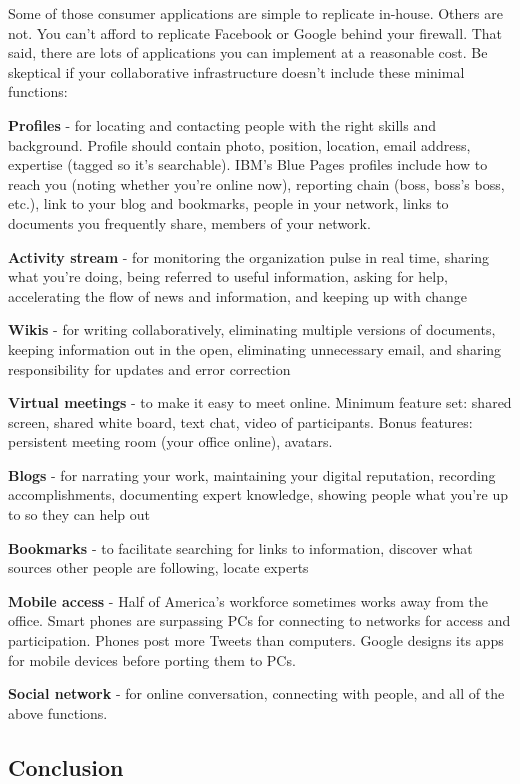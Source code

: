 Some of those consumer applications are simple to replicate in-house.
Others are not. You can't afford to replicate Facebook or Google behind
your firewall. That said, there are lots of applications you can
implement at a reasonable cost. Be skeptical if your collaborative
infrastructure doesn't include these minimal functions:

\textbf{Profiles} - for locating and contacting people with the right
skills and background. Profile should contain photo, position, location,
email address, expertise (tagged so it's searchable). IBM's Blue Pages
profiles include how to reach you (noting whether you're online now),
reporting chain (boss, boss's boss, etc.), link to your blog and
bookmarks, people in your network, links to documents you frequently
share, members of your network.

\textbf{Activity stream} - for monitoring the organization pulse in real
time, sharing what you're doing, being referred to useful information,
asking for help, accelerating the flow of news and information, and
keeping up with change

\textbf{Wikis} - for writing collaboratively, eliminating multiple
versions of documents, keeping information out in the open, eliminating
unnecessary email, and sharing responsibility for updates and error
correction

\textbf{Virtual meetings} - to make it easy to meet online. Minimum
feature set: shared screen, shared white board, text chat, video of
participants. Bonus features: persistent meeting room (your office
online), avatars.

\textbf{Blogs} - for narrating your work, maintaining your digital
reputation, recording accomplishments, documenting expert knowledge,
showing people what you're up to so they can help out

\textbf{Bookmarks} - to facilitate searching for links to information,
discover what sources other people are following, locate experts

\textbf{Mobile access} - Half of America's workforce sometimes works
away from the office. Smart phones are surpassing PCs for connecting to
networks for access and participation. Phones post more Tweets than
computers. Google designs its apps for mobile devices before porting
them to PCs.

\textbf{Social network} - for online conversation, connecting with
people, and all of the above functions.

\subsection{Conclusion}\label{conclusion}

